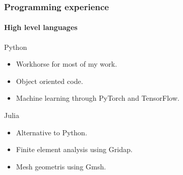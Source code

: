 \documentclass[
	10pt, %
]{beamer}
\begin{document}
\begin{frame}
	\frametitle{Programming experience}
	\framesubtitle{High level languages}

	{\large Python} 
	\begin{itemize}
		\item Workhorse for most of my work.
		\item Object oriented code.
		\item Machine learning through PyTorch and TensorFlow.
	\end{itemize}

	{\large Julia} 
	\begin{itemize}
		\item Alternative to Python. 
		\item Finite element analysis using Gridap.
		\item Mesh geometris using Gmsh.
	\end{itemize}


\end{frame}
\end{document}
